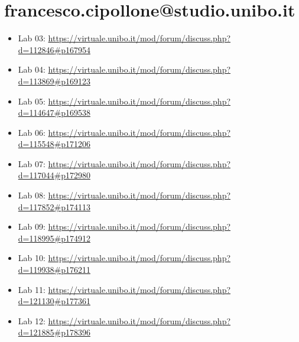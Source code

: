 \documentclass[12pt, a4paper]{report}
\theoremstyle{definition}
\begin{document}
\section{francesco.cipollone@studio.unibo.it}

\begin{itemize}
    \item Lab 03: \url{https://virtuale.unibo.it/mod/forum/discuss.php?d=112846#p167954}
    \item Lab 04: \url{https://virtuale.unibo.it/mod/forum/discuss.php?d=113869#p169123}
    \item Lab 05: \url{https://virtuale.unibo.it/mod/forum/discuss.php?d=114647#p169538}
    \item Lab 06: \url{https://virtuale.unibo.it/mod/forum/discuss.php?d=115548#p171206}
    \item Lab 07: \url{https://virtuale.unibo.it/mod/forum/discuss.php?d=117044#p172980}
    \item Lab 08: \url{https://virtuale.unibo.it/mod/forum/discuss.php?d=117852#p174113}
    \item Lab 09: \url{https://virtuale.unibo.it/mod/forum/discuss.php?d=118995#p174912}
    \item Lab 10: \url{https://virtuale.unibo.it/mod/forum/discuss.php?d=119938#p176211}
    \item Lab 11: \url{https://virtuale.unibo.it/mod/forum/discuss.php?d=121130#p177361}
    \item Lab 12: \url{https://virtuale.unibo.it/mod/forum/discuss.php?d=121885#p178396}
\end{itemize}

\printbibliography
\end{document}
